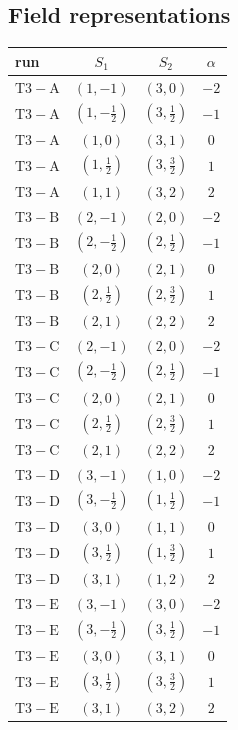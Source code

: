 \documentclass[9pt]{article}
\begin{document}
\subsection*{Field representations}
\begin{longtable}{@{}lccc@{}}
\toprule
run & $S_1$ & $S_2$ & $\alpha$ \\
\midrule
$\mathrm{T3-A}$ & $(1,-1)$ & $(3,0)$ & $-2$ \\
$\mathrm{T3-A}$ & $(1,- \frac{1}{2})$ & $(3,\frac{1}{2})$ & $-1$ \\
$\mathrm{T3-A}$ & $(1,0)$ & $(3,1)$ & $0$ \\
$\mathrm{T3-A}$ & $(1,\frac{1}{2})$ & $(3,\frac{3}{2})$ & $1$ \\
$\mathrm{T3-A}$ & $(1,1)$ & $(3,2)$ & $2$ \\
$\mathrm{T3-B}$ & $(2,-1)$ & $(2,0)$ & $-2$ \\
$\mathrm{T3-B}$ & $(2,- \frac{1}{2})$ & $(2,\frac{1}{2})$ & $-1$ \\
$\mathrm{T3-B}$ & $(2,0)$ & $(2,1)$ & $0$ \\
$\mathrm{T3-B}$ & $(2,\frac{1}{2})$ & $(2,\frac{3}{2})$ & $1$ \\
$\mathrm{T3-B}$ & $(2,1)$ & $(2,2)$ & $2$ \\
$\mathrm{T3-C}$ & $(2,-1)$ & $(2,0)$ & $-2$ \\
$\mathrm{T3-C}$ & $(2,- \frac{1}{2})$ & $(2,\frac{1}{2})$ & $-1$ \\
$\mathrm{T3-C}$ & $(2,0)$ & $(2,1)$ & $0$ \\
$\mathrm{T3-C}$ & $(2,\frac{1}{2})$ & $(2,\frac{3}{2})$ & $1$ \\
$\mathrm{T3-C}$ & $(2,1)$ & $(2,2)$ & $2$ \\
$\mathrm{T3-D}$ & $(3,-1)$ & $(1,0)$ & $-2$ \\
$\mathrm{T3-D}$ & $(3,- \frac{1}{2})$ & $(1,\frac{1}{2})$ & $-1$ \\
$\mathrm{T3-D}$ & $(3,0)$ & $(1,1)$ & $0$ \\
$\mathrm{T3-D}$ & $(3,\frac{1}{2})$ & $(1,\frac{3}{2})$ & $1$ \\
$\mathrm{T3-D}$ & $(3,1)$ & $(1,2)$ & $2$ \\
$\mathrm{T3-E}$ & $(3,-1)$ & $(3,0)$ & $-2$ \\
$\mathrm{T3-E}$ & $(3,- \frac{1}{2})$ & $(3,\frac{1}{2})$ & $-1$ \\
$\mathrm{T3-E}$ & $(3,0)$ & $(3,1)$ & $0$ \\
$\mathrm{T3-E}$ & $(3,\frac{1}{2})$ & $(3,\frac{3}{2})$ & $1$ \\
$\mathrm{T3-E}$ & $(3,1)$ & $(3,2)$ & $2$ \\
\bottomrule
\end{longtable}
\end{document}
